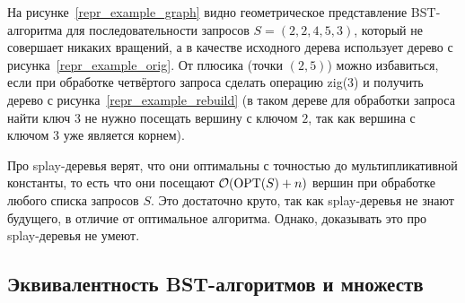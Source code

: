 На рисунке~\ref{repr_example_graph} видно геометрическое представление BST-алгоритма для последовательности запросов $S = (2, 2, 4, 5, 3)$, который не совершает никаких вращений, а в качестве исходного дерева использует дерево с рисунка~\ref{repr_example_orig}. От плюсика (точки $(2, 5)$) можно избавиться, если
при обработке четвёртого запроса сделать операцию \textrm{zig(3)} и получить дерево с рисунка~\ref{repr_example_rebuild} (в таком дереве для обработки запроса \textrm{найти ключ 3} не нужно посещать вершину с ключом $2$, так как вершина с ключом $3$ уже является корнем).

Про splay-деревья верят, что они оптимальны с точностью до мультипликативной константы,
то есть что они посещают $\mathcal{O}(\operatorname{OPT}(S) + n)$ вершин при обработке любого списка запросов $S$. Это достаточно круто, так как splay-деревья не знают будущего,
в отличие от оптимальное алгоритма. Однако, доказывать это про splay-деревья не умеют.



\subsection{Эквивалентность BST-алгоритмов и \arbs множеств}

